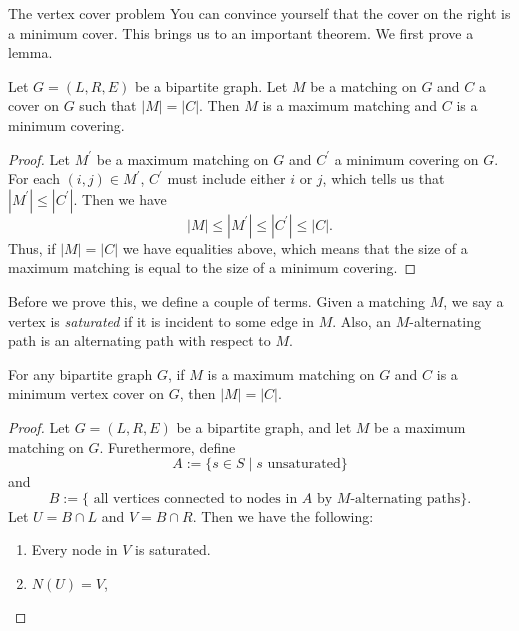 \documentclass[11pt]{article}
\renewcommand{\'}{^{'}}
\newenvironment{theorem}[2][Theorem]{\begin{trivlist}
\item[\hskip \labelsep {\bfseries #1}\hskip \labelsep {\bfseries #2.}]}{\end{trivlist}}
\newenvironment{lemma}[2][Lemma]{\begin{trivlist}
\item[\hskip \labelsep {\bfseries #1}\hskip \labelsep {\bfseries #2.}]}{\end{trivlist}}
\begin{document}
\begin{section}{The vertex cover problem}
	You can convince yourself that the cover on the right is a minimum cover. This brings us 
	to an important theorem. We first prove a lemma.

	\begin{lemma}{1}
		Let $G=(L,R,E)$ be a bipartite graph. Let $M$ be a matching on $G$ and $C$ a cover on 
		$G$ such that $|M| = |C|$. Then $M$ is a maximum matching and $C$ is a minimum 
		covering.
	\end{lemma}

	\begin{proof}
		Let $M\'$ be a maximum matching on $G$ and $C\'$ a minimum covering on $G$. For each 
		$(i,j)\in M\'$, $C\'$ must include either $i$ or $j$, which tells us that 
		$|M\'| \leq |C\'|$. Then we have 
		\[
			|M|\leq |M\'| \leq |C\'| \leq |C|.
		\]
		Thus, if $|M| = |C|$ we have equalities above, which means that the size of a maximum 
		matching is equal to the size of a minimum covering.
	\end{proof}

	Before we prove this, we define a couple of terms. Given a matching $M$, we say a vertex is 
	\emph{saturated} if it is incident to some edge in $M$. Also, an $M$-alternating path is 
	an alternating path with respect to $M$.

	\begin{theorem}{(K\H{o}nig-Egervary)}
		For any bipartite graph $G$, if $M$ is a maximum matching on $G$ and $C$ is a minimum 
		vertex cover  on $G$, then $|M| = |C|$.
	\end{theorem}

	\begin{proof}
		Let $G=(L,R,E)$ be a bipartite graph, and let $M$ be a maximum matching on $G$. 
		Furethermore, define
		\[
			A := \{s\in S\; |\; s \text{ unsaturated}\}
		\]
		and
		\[
			B := \{\text{ all vertices connected to nodes in $A$ by $M$-alternating paths}\}
			.
		\]
		Let $U = B\cap L$ and $V = B\cap R$. Then we have the following:

		\begin{enumerate}
			\item Every node in $V$ is saturated.
			\item $N(U) = V$,
		\end{enumerate}


\end{proof}
\end{section}
\end{document}
